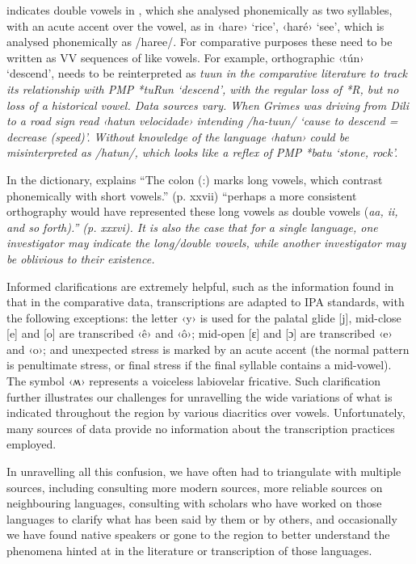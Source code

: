 \citet[19-21]{vanKlinken1999} indicates double vowels in ,
which she analysed phonemically as two syllables,
with an acute accent over the vowel,
as in ‹hare› ‘rice’,
‹haré› ‘see’, which is analysed phonemically as /haree/.
For comparative purposes these need to be written as VV sequences of like vowels.
For example, orthographic ‹tún› ‘descend’, needs to be reinterpreted
as \it{tuun} in the comparative literature to track its relationship
with PMP *tuRun ‘descend’,
with the regular loss of *R,
but no loss of a historical vowel. Data sources vary.
When Grimes was driving from Dili to  a road sign read
‹hatun velocidade› intending /ha-tuun/ ‘cause to descend = decrease (speed)’.
Without knowledge of the language ‹hatun› could be misinterpreted
as /hatun/, which looks like a reflex of PMP *batu ‘stone, rock’.

In the  dictionary,
\citet{Collins2003a} explains “The colon (:) marks long vowels,
which contrast phonemically with short vowels.” (p.
xxvii) “perhaps a more consistent orthography would have represented
these long vowels as double vowels (\it{aa},
\it{ii}, and so forth).” (p. xxxvi).
It is also the case that for a single language,
one investigator may indicate the long/double vowels,
while another investigator may be oblivious to their existence.

Informed clarifications are extremely helpful,
such as the information found in \citet{Nivens2017} that in the
comparative  data, transcriptions are adapted to IPA standards,
with the following exceptions: the letter ‹y› is used for
the palatal glide [j],
 mid-close [e] and [o] are transcribed ‹ê›
and ‹ô›; mid-open [ɛ]
and [ɔ] are transcribed ‹e›
and ‹o›; and unexpected stress is marked by an acute accent (the
normal pattern is penultimate stress,
or final stress if the final syllable contains a mid-vowel).
The symbol ‹ʍ› represents a voiceless labiovelar fricative.
Such clarification further illustrates our challenges for unravelling
the wide variations of what is indicated throughout the region
by various diacritics over vowels.
Unfortunately, many sources of data provide no information about
the transcription practices employed.

In unravelling all this confusion,
we have often had to triangulate with multiple sources,
including consulting more modern sources,
more reliable sources on neighbouring languages,
consulting with scholars who have worked on those languages to
clarify what has been said by them or by others,
and occasionally we have found native speakers or gone to the
region to better understand the phenomena hinted at in the literature
or transcription of those languages.


